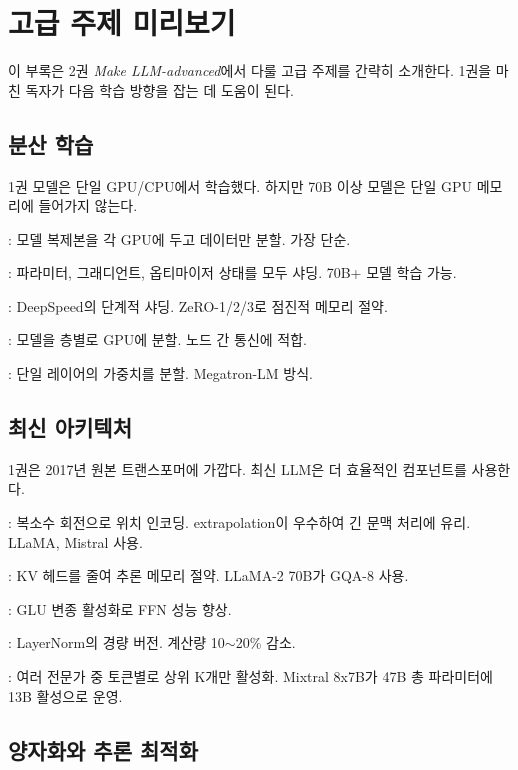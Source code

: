 \chapter{고급 주제 미리보기}
\label{app:advanced_preview}

이 부록은 2권 \textit{Make LLM-advanced}에서 다룰 고급 주제를 간략히 소개한다. 1권을 마친 독자가 다음 학습 방향을 잡는 데 도움이 된다.

\section{분산 학습}

1권 모델은 단일 GPU/CPU에서 학습했다. 하지만 70B 이상 모델은 단일 GPU 메모리에 들어가지 않는다.

: 모델 복제본을 각 GPU에 두고 데이터만 분할. 가장 단순.

: 파라미터, 그래디언트, 옵티마이저 상태를 모두 샤딩. 70B+ 모델 학습 가능.

: DeepSpeed의 단계적 샤딩. ZeRO-1/2/3로 점진적 메모리 절약.

: 모델을 층별로 GPU에 분할. 노드 간 통신에 적합.

: 단일 레이어의 가중치를 분할. Megatron-LM 방식.

\section{최신 아키텍처}

1권은 2017년 원본 트랜스포머에 가깝다. 최신 LLM은 더 효율적인 컴포넌트를 사용한다.

: 복소수 회전으로 위치 인코딩. extrapolation이 우수하여 긴 문맥 처리에 유리. LLaMA, Mistral 사용.

: KV 헤드를 줄여 추론 메모리 절약. LLaMA-2 70B가 GQA-8 사용.

: GLU 변종 활성화로 FFN 성능 향상.

: LayerNorm의 경량 버전. 계산량 10$\sim$20\% 감소.

: 여러 전문가 중 토큰별로 상위 K개만 활성화. Mixtral 8x7B가 47B 총 파라미터에 13B 활성으로 운영.

\section{양자화와 추론 최적화}

